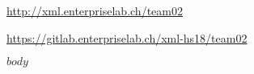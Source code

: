 \documentclass[a4paper,twocolumn]{scrartcl}
\title{\Title}
\date{\Date}
\author{\Author}
\subtitle{$subtitle$}
\begin{document}
\maketitle

\begin{center}
    \url{http://xml.enterpriselab.ch/team02}

    \url{https://gitlab.enterpriselab.ch/xml-hs18/team02}
\end{center}

\vspace{5mm}

\thispagestyle{fancy}

$body$

\end{document}
